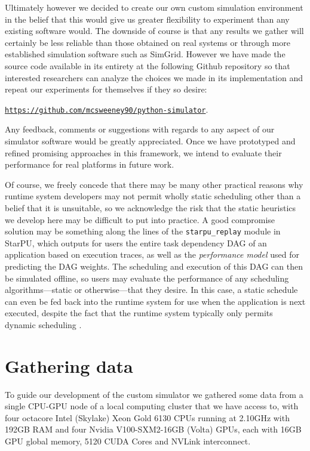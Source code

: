 \documentclass[runningheads]{llncs}
\begin{document}
Ultimately however we decided to create our own custom simulation environment in the belief that this would give us greater flexibility to experiment than any existing software would. The downside of course is that any results we gather will certainly be less reliable than those obtained on real systems or through more established simulation software such as SimGrid. However we have made the source code available in its entirety at the following Github repository so that interested researchers can analyze the choices we made in its implementation and repeat our experiments for themselves if they so desire:

\href{https://github.com/mcsweeney90/python-simulator}{{\tt https://github.com/mcsweeney90/python-simulator}}.

\noindent
Any feedback, comments or suggestions with regards to any aspect of our simulator software would be greatly appreciated. Once we have prototyped and refined promising approaches in this framework, we intend to evaluate their performance for real platforms in future work. 

Of course, we freely concede that there may be many other practical reasons why runtime system developers may not permit wholly static scheduling other than a belief that it is unsuitable, so we acknowledge the risk that the static heuristics we develop here may be difficult to put into practice. A good compromise solution may be something along the lines of the {\tt starpu\_replay} module in StarPU, which outputs for users the entire task dependency DAG of an application based on execution traces, as well as the {\em performance model} used for predicting the DAG weights. The scheduling and execution of this DAG can then be simulated offline, so users may evaluate the performance of any scheduling algorithms---static or otherwise---that they desire. In this case, a static schedule can even be fed back into the runtime system for use when the application is next executed, despite the fact that the runtime system typically only permits dynamic scheduling \cite[Sect.~3.18]{thibault:tel-01959127}. 

\section{Gathering data}
\label{sect.gathering_data}

To guide our development of the custom simulator we gathered some data from a single CPU-GPU node of a local computing cluster that we have access to, with four octacore Intel (Skylake) Xeon Gold 6130 CPUs running at 2.10GHz with 192GB RAM and four Nvidia V100-SXM2-16GB (Volta) GPUs, each with 16GB GPU global memory, 5120 CUDA Cores and NVLink interconnect. 
\end{document}
